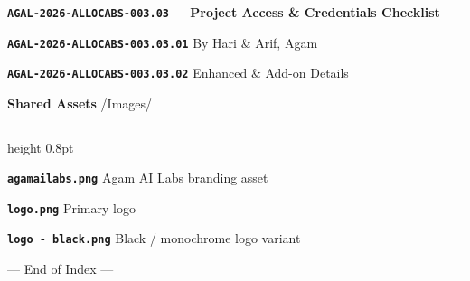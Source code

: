 \documentclass[11pt,a4paper]{article}
\newcommand{\indexsubfolder}[2]{
    \vspace{0.8em}\noindent\hspace*{1cm}%
    \textbf{\texttt{#1}} --- \textbf{\textsf{#2}}\par\vspace{0.4em}
}
\newcommand{\indexfile}[2]{
    \noindent\hspace*{1cm}%
    \textbf{\texttt{#1}} \dotfill{} \textsf{#2}\par\vspace{0.4em}
}
\newcommand{\indexsubfile}[2]{
    \noindent\hspace*{2cm}%
    \textbf{\texttt{#1}} \dotfill{} \textsf{#2}\par\vspace{0.4em}
}
\newcommand{\assetfolder}[2]{
    \vspace{2.5em}\noindent
    {\Large\bfseries\color{Navy} #1} \hfill {\small\ttfamily\color{Gray} #2}
    \par\vspace{0.2em}
    {\color{Navy}\hrule height 0.8pt}
    \par\vspace{1em}
}
\begin{document}
\indexsubfolder{AGAL-2026-ALLOCABS-003.03}{Project Access \& Credentials Checklist}
\indexsubfile{AGAL-2026-ALLOCABS-003.03.01}{By Hari \& Arif, Agam}
\indexsubfile{AGAL-2026-ALLOCABS-003.03.02}{Enhanced \& Add-on Details}



\assetfolder{Shared Assets}
            {/Images/}

\indexfile{agamailabs.png}{Agam AI Labs branding asset}
\indexfile{logo.png}{Primary logo}
\indexfile{logo - black.png}{Black / monochrome logo variant}


\vfill
\begin{center}
    {\footnotesize\color{Gray} --- End of Index ---}
\end{center}
\end{document}
